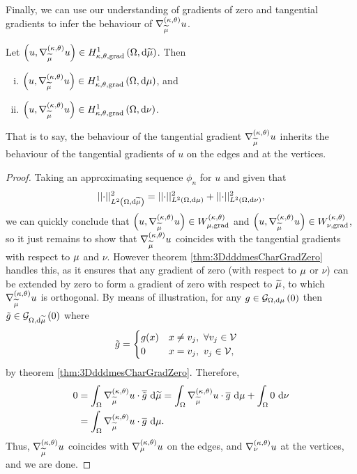 Finally, we can use our understanding of gradients of zero and tangential gradients to infer the behaviour of $\nabla^{\left( \kappa, \theta \right)}_{\widetilde{\mu}}u$.
\begin{theorem} \label{thm:dddmesTangGradImplication}
	Let $\left( u,\nabla^{\left( \kappa, \theta \right)}_{\widetilde{\mu}}u \right)\in H^1_{\kappa,\theta,\mathrm{grad}}\left( \Omega, \mathrm{d}\widetilde{\mu} \right)$.
	Then
	\begin{enumerate}[(i)]
		\item $\left( u,\nabla^{\left( \kappa, \theta \right)}_{\widetilde{\mu}}u \right)\in H^1_{\kappa,\theta,\mathrm{grad}}\left( \Omega, \mathrm{d}\mu \right)$, and
		\item $\left( u,\nabla^{\left( \kappa, \theta \right)}_{\widetilde{\mu}}u \right)\in H^1_{\kappa,\theta,\mathrm{grad}}\left( \Omega, \mathrm{d}\nu \right)$.
	\end{enumerate}
\end{theorem}
That is to say, the behaviour of the tangential gradient $\nabla^{\left( \kappa, \theta \right)}_{\widetilde{\mu}}u$ inherits the behaviour of the tangential gradients of $u$ on the edges and at the vertices.
\begin{proof}
	Taking an approximating sequence $\phi_n$ for $u$ and given that
	\begin{align*}
		\lvert\lvert \cdot \rvert\rvert_{L^{2}\left( \Omega,\mathrm{d}\widetilde{\mu} \right)}^2 = \lvert\lvert \cdot \rvert\rvert_{L^{2}\left( \Omega,\mathrm{d}\mu \right)}^2 + \lvert\lvert \cdot \rvert\rvert_{L^{2}\left( \Omega,\mathrm{d}\nu \right)}^2,
	\end{align*}
	we can quickly conclude that $\left( u,\nabla^{\left( \kappa, \theta \right)}_{\widetilde{\mu}}u \right)\in W_{\mu, \mathrm{grad}}^{\left( \kappa, \theta \right)}$ and $\left( u,\nabla^{\left( \kappa, \theta \right)}_{\widetilde{\mu}}u \right)\in W_{\nu, \mathrm{grad}}^{\left( \kappa, \theta \right)}$, so it just remains to show that $\nabla^{\left( \kappa, \theta \right)}_{\widetilde{\mu}}u$ coincides with the tangential gradients with respect to $\mu$ and $\nu$.
	However theorem \ref{thm:3DdddmesCharGradZero} handles this, as it ensures that any gradient of zero (with respect to $\mu$ or $\nu$) can be extended by zero to form a gradient of zero with respect to $\widetilde{\mu}$, to which $\nabla^{\left( \kappa, \theta \right)}_{\widetilde{\mu}}u$ is orthogonal.
	By means of illustration, for any $g\in\mathcal{G}_{ \Omega, \mathrm{d}\mu}\left( 0 \right)$ then $\tilde{g}\in\mathcal{G}_{ \Omega, \mathrm{d}\widetilde{\mu}}\left( 0 \right)$ where
	\begin{align*}
		\tilde{g} &= 
		\begin{cases} g(x) & x\neq v_j, \ \forall v_j\in\mathcal{V} \\ 0 & x=v_j, \ v_j\in\mathcal{V}, \end{cases}
	\end{align*}
	by theorem \ref{thm:3DdddmesCharGradZero}.
	Therefore,
	\begin{align*}
		0 &= \int_{\Omega} \nabla^{\left( \kappa, \theta \right)}_{\widetilde{\mu}}u\cdot\overline{\tilde{g}}  \ \mathrm{d}\widetilde{\mu}
		= \int_{\Omega} \nabla^{\left( \kappa, \theta \right)}_{\widetilde{\mu}}u\cdot\overline{g}  \ \mathrm{d}\mu + \int_{\Omega} 0  \ \mathrm{d}\nu \\
		&= \int_{\Omega} \nabla^{\left( \kappa, \theta \right)}_{\widetilde{\mu}}u\cdot\overline{g}  \ \mathrm{d}\mu.
	\end{align*}
	Thus, $\nabla^{\left( \kappa, \theta \right)}_{\widetilde{\mu}}u$ coincides with $\nabla^{\left( \kappa, \theta \right)}_{\mu}u$ on the edges, and $\nabla^{\left( \kappa, \theta \right)}_{\nu}u$ at the vertices, and we are done.
\end{proof}
